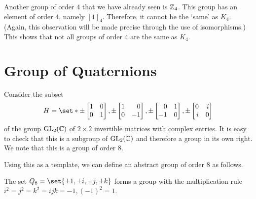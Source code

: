 \documentclass[11pt]{penrose}
\begin{document}
Another group of order $4$ that we have already seen is $\mathbb{Z}_4$. This group has an element of order $4$, namely $[1]_4$. Therefore, it cannot be the `same' as $K_4$. (Again, this observation will be made precise through the use of isomorphisms.) This shows that not all groups of order $4$ are the same as $K_4$.

\section{Group of Quaternions}
Consider the subset
\begin{equation*}
    H = \set*{
    \pm\begin{bmatrix*}[r]1 & 0\\ 0 & 1\end{bmatrix*},
    \pm\begin{bmatrix*}[r]1 & 0\\ 0 &-1\end{bmatrix*},
    \pm\begin{bmatrix*}[r]0 & 1\\-1 & 0\end{bmatrix*},
    \pm\begin{bmatrix*}[r]0 & i\\ i & 0\end{bmatrix*} }
\end{equation*}
of the group $\mathrm{GL}_2(\mathbb{C})$ of $2 \times 2$ invertible matrices with complex entries. It is easy to check that this is a subgroup of $\mathrm{GL}_2(\mathbb{C})$ and therefore a group in its own right. We note that this is a group of order $8$.

Using this as a template, we can define an abstract group of order $8$ as follows.
\begin{nthm}
    The set $Q_8 = \set{\pm 1, \pm i, \pm j, \pm k}$ forms a group with the multiplication rule $i^2 = j^2 = k^2 = ijk = -1, (-1)^2 = 1$.
\end{nthm}
\end{document}
